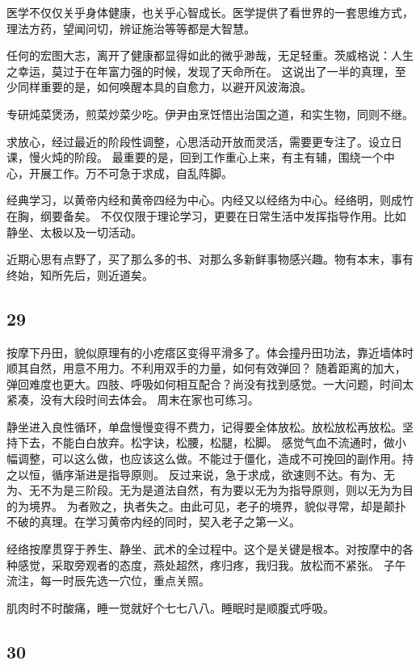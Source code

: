医学不仅仅关乎身体健康，也关乎心智成长。医学提供了看世界的一套思维方式，理法方药，望闻问切，辨证施治等等都是大智慧。

任何的宏图大志，离开了健康都显得如此的微乎渺哉，无足轻重。茨威格说：人生之幸运，莫过于在年富力强的时候，发现了天命所在。
这说出了一半的真理，至少同样重要的是，如何唤醒本具的自愈力，以避开风波海浪。

专研炖菜煲汤，煎菜炒菜少吃。伊尹由烹饪悟出治国之道，和实生物，同则不继。

求放心，经过最近的阶段性调整，心思活动开放而灵活，需要更专注了。设立日课，慢火炖的阶段。
最重要的是，回到工作重心上来，有主有辅，围绕一个中心，开展工作。万不可急于求成，自乱阵脚。

经典学习，以黄帝内经和黄帝四经为中心。内经又以经络为中心。经络明，则成竹在胸，纲要备矣。
不仅仅限于理论学习，更要在日常生活中发挥指导作用。比如静坐、太极以及一切活动。

近期心思有点野了，买了那么多的书、对那么多新鲜事物感兴趣。物有本末，事有终始，知所先后，则近道矣。

\subsection{29}

按摩下丹田，貌似原理有的小疙瘩区变得平滑多了。体会撞丹田功法，靠近墙体时顺其自然，用意不用力。不利用双手的力量，如何有效弹回？
随着距离的加大，弹回难度也更大。四肢、呼吸如何相互配合？尚没有找到感觉。一大问题，时间太紧凑，没有大段时间去体会。
周末在家也可练习。

静坐进入良性循环，单盘慢慢变得不费力，记得要全体放松。放松放松再放松。坚持下去，不能白白放弃。松字诀，松腰，松腿，松脚。
感觉气血不流通时，做小幅调整，可以这么做，也应该这么做。不能过于僵化，造成不可挽回的副作用。持之以恒，循序渐进是指导原则。
反过来说，急于求成，欲速则不达。有为、无为、无不为是三阶段。无为是道法自然，有为要以无为为指导原则，则以无为为目的为境界。
为者败之，执者失之。由此可见，老子的境界，貌似寻常，却是颠扑不破的真理。在学习黄帝内经的同时，契入老子之第一义。

经络按摩贯穿于养生、静坐、武术的全过程中。这个是关键是根本。对按摩中的各种感觉，采取旁观者的态度，燕处超然，疼归疼，我归我。放松而不紧张。
子午流注，每一时辰先选一穴位，重点关照。

肌肉时不时酸痛，睡一觉就好个七七八八。睡眠时是顺腹式呼吸。

\subsection{30}

